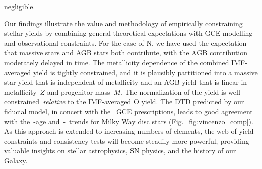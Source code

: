 \documentclass[ms.tex]{subfiles}
\begin{document}
negligible.
\par
Our findings illustrate the value and methodology of empirically constraining
stellar yields by combining general theoretical expectations with GCE modelling
and observational constraints.
For the case of N, we have used the expectation that massive stars and AGB stars
both contribute, with the AGB contribution moderately delayed in time.
The metallicity dependence of the combined IMF-averaged yield is tightly
constrained, and it is plausibly partitioned into a massive star yield that is
independent of metallicity and an AGB yield that is linear in metallicity~$Z$
and progenitor mass~$M$.
The normalization of the yield is well-constrained~\textit{relative} to the
IMF-averaged O yield.
The DTD predicted by our fiducial model, in concert with the~\citet{Johnson2021}
GCE prescriptions, leads to good agreement with the~\no-age and~\no-\ofe~trends
for Milky Way disc stars (Fig.~\ref{fig:vincenzo_comp}).
As this approach is extended to increasing numbers of elements, the web of
yield constraints and consistency tests will become steadily more powerful,
providing valuable insights on stellar astrophysics, SN physics, and the
history of our Galaxy.
\end{document}
